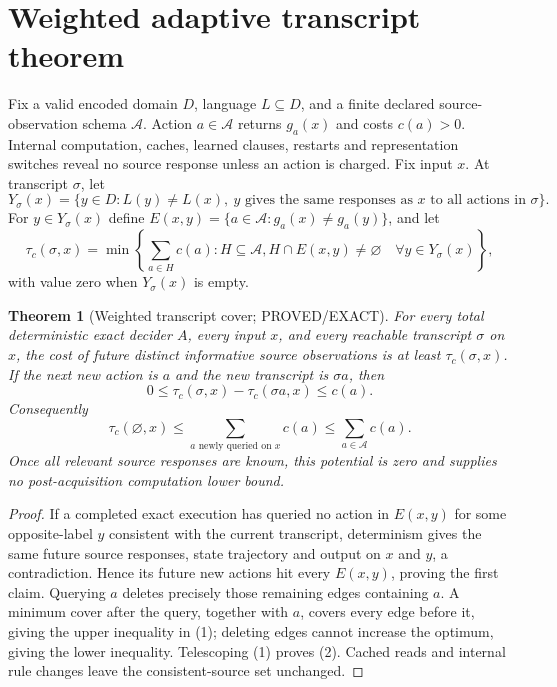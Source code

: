 \documentclass[11pt]{article}
\newtheorem{theorem}{Theorem}
\begin{document}
\section{Weighted adaptive transcript theorem}
Fix a valid encoded domain $D$, language $L\subseteq D$, and a finite declared
source-observation schema $\mathcal A$.  Action $a\in\mathcal A$ returns
$g_a(x)$ and costs $c(a)>0$.  Internal computation, caches, learned clauses,
restarts and representation switches reveal no source response unless an
action is charged.  Fix input $x$.  At transcript $\sigma$, let
\[
Y_\sigma(x)=\{y\in D:L(y)\ne L(x),\ y\text{ gives the same responses as }x
\text{ to all actions in }\sigma\}.
\]
For $y\in Y_\sigma(x)$ define
$E(x,y)=\{a\in\mathcal A:g_a(x)\ne g_a(y)\}$, and let
\[
\tau_c(\sigma,x)=
\min\left\{\sum_{a\in H}c(a):H\subseteq\mathcal A,
H\cap E(x,y)\ne\varnothing\quad\forall y\in Y_\sigma(x)\right\},
\]
with value zero when $Y_\sigma(x)$ is empty.

\begin{theorem}[Weighted transcript cover; PROVED/EXACT]\label{th:cover}
For every total deterministic exact decider $A$, every input $x$, and every
reachable transcript $\sigma$ on $x$, the cost of future distinct informative
source observations is at least $\tau_c(\sigma,x)$.  If the next new action is
$a$ and the new transcript is $\sigma a$, then
\[
0\le \tau_c(\sigma,x)-\tau_c(\sigma a,x)\le c(a).                 \tag{1}
\]
Consequently
\[
\tau_c(\varnothing,x)\le \sum_{a\text{ newly queried on }x}c(a)
\le \sum_{a\in\mathcal A}c(a).                                  \tag{2}
\]
Once all relevant source responses are known, this potential is zero and
supplies no post-acquisition computation lower bound.
\end{theorem}
\begin{proof}
If a completed exact execution has queried no action in $E(x,y)$ for some
opposite-label $y$ consistent with the current transcript, determinism gives
the same future source responses, state trajectory and output on $x$ and $y$,
a contradiction.  Hence its future new actions hit every $E(x,y)$, proving the
first claim.  Querying $a$ deletes precisely those remaining edges containing
$a$.  A minimum cover after the query, together with $a$, covers every edge
before it, giving the upper inequality in (1); deleting edges cannot increase
the optimum, giving the lower inequality.  Telescoping (1) proves (2).  Cached
reads and internal rule changes leave the consistent-source set unchanged.
\end{proof}
\end{document}
